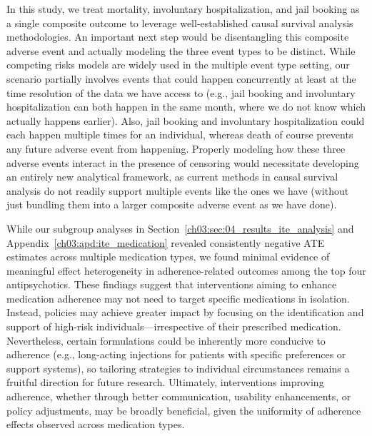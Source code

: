 In this study, we treat mortality, involuntary hospitalization, and jail booking as a single composite outcome to leverage well-established causal survival analysis methodologies.
An important next step would be disentangling this composite adverse event and actually modeling the three event types to be distinct.
While competing risks models are widely used in the multiple event type setting, our scenario partially involves events that could happen concurrently at least at the time resolution of the data we have access to (e.g., jail booking and involuntary hospitalization can both happen in the same month, where we do not know which actually happens earlier). 
Also, jail booking and involuntary hospitalization could each happen multiple times for an individual, whereas death of course prevents any future adverse event from happening.
Properly modeling how these three adverse events interact in the presence of censoring would necessitate developing an entirely new analytical framework, as current methods in causal survival analysis do not readily support multiple events like the ones we have (without just bundling them into a larger composite adverse event as we have done).


While our subgroup analyses in Section~\ref{ch03:sec:04_results_ite_analysis} and Appendix~\ref{ch03:apd:ite_medication} revealed consistently negative ATE estimates across multiple medication types, we found minimal evidence of meaningful effect heterogeneity in adherence-related outcomes among the top four antipsychotics.
These findings suggest that interventions aiming to enhance medication adherence may not need to target specific medications in isolation.
Instead, policies may achieve greater impact by focusing on the identification and support of high-risk individuals—irrespective of their prescribed medication.
Nevertheless, certain formulations could be inherently more conducive to adherence (e.g., long-acting injections for patients with specific preferences or support systems), so tailoring strategies to individual circumstances remains a fruitful direction for future research.
Ultimately, interventions improving adherence, whether through better communication, usability enhancements, or policy adjustments, may be broadly beneficial, given the uniformity of adherence effects observed across medication types.

